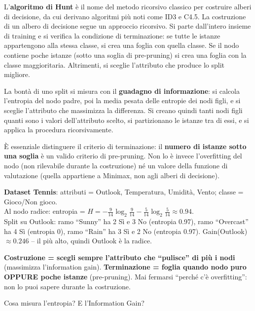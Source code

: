 \documentclass[12pt,a4paper]{article}
\begin{document}
L'\textbf{algoritmo di Hunt} è il nome del metodo ricorsivo classico per costruire alberi di decisione, da cui derivano algoritmi più noti come ID3 e C4.5. La costruzione di un albero di decisione segue un approccio ricorsivo. Si parte dall'intero insieme di training e si verifica la condizione di terminazione: se tutte le istanze appartengono alla stessa classe, si crea una foglia con quella classe. Se il nodo contiene poche istanze (sotto una soglia di pre-pruning) si crea una foglia con la classe maggioritaria. Altrimenti, si sceglie l'attributo che produce lo split migliore.

La bontà di uno split si misura con il \textbf{guadagno di informazione}: si calcola l'entropia del nodo padre, poi la media pesata delle entropie dei nodi figli, e si sceglie l'attributo che massimizza la differenza. Si creano quindi tanti nodi figli quanti sono i valori dell'attributo scelto, si partizionano le istanze tra di essi, e si applica la procedura ricorsivamente.

È essenziale distinguere il criterio di terminazione: il \textbf{numero di istanze sotto una soglia} è un valido criterio di pre-pruning. Non lo è invece l'overfitting del nodo (non rilevabile durante la costruzione) né un valore della funzione di valutazione (quella appartiene a Minimax, non agli alberi di decisione).

\begin{esempiobox}
\textbf{Dataset Tennis}: attributi = Outlook, Temperatura, Umidità, Vento; classe = Gioco/Non gioco. \\
Al nodo radice: entropia = $H = -\frac{9}{14}\log_2\frac{9}{14} - \frac{5}{14}\log_2\frac{5}{14} \approx 0.94$. \\
Split su Outlook: ramo ``Sunny'' ha 2 Sì e 3 No (entropia 0.97), ramo ``Overcast'' ha 4 Sì (entropia 0), ramo ``Rain'' ha 3 Sì e 2 No (entropia 0.97). Gain(Outlook) $\approx 0.246$ -- il più alto, quindi Outlook è la radice.
\end{esempiobox}

\begin{ricordabox}
\textbf{Costruzione = scegli sempre l'attributo che ``pulisce'' di più i nodi} (massimizza l'information gain). \textbf{Terminazione = foglia quando nodo puro OPPURE poche istanze} (pre-pruning). Mai fermarsi ``perché c'è overfitting'': non lo puoi sapere durante la costruzione.
\end{ricordabox}

\begin{domandabox}{Cosa misura l'entropia? E l'Information Gain?}
\end{domandabox}
\end{document}
